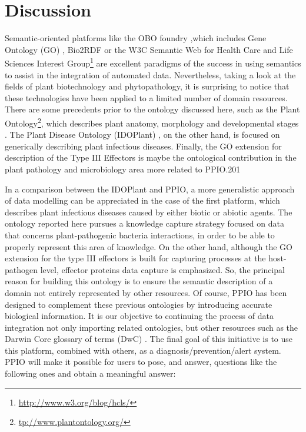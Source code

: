 \documentclass[sw]{iosart2c}
\newcommand{\myurl}[1]{\footnote{\url{#1}}}
\begin{document}
\section{Discussion}\label{sec:discussion}

Semantic-oriented platforms like the OBO foundry \cite{Smith},which includes Gene Ontology (GO) \cite{Gene}, Bio2RDF \cite{RDF} or the W3C Semantic Web for Health Care and Life Sciences Interest Group\myurl{http://www.w3.org/blog/hcls/} are excellent paradigms of the success in using semantics to assist in the integration of automated data. Nevertheless, taking a look at the fields of plant biotechnology and phytopathology, it is surprising to notice that these technologies have been applied to a limited number of domain resources. There are some precedents prior to the ontology discussed here, such as the Plant Ontology\myurl{tp://www.plantontology.org/}, which describes plant anatomy, morphology and developmental stages \cite{PO}. The Plant Disease Ontology (IDOPlant) \cite{Walls} \cite{IDO}, on the other hand, is focused on generically describing plant infectious diseases. Finally, the GO extension for description of the Type III Effectors \cite{Lindeberg} is maybe the ontological contribution in the plant pathology and microbiology area more related to PPIO.201

In a comparison between the IDOPlant and PPIO, a more generalistic approach of data modelling can be appreciated in the case of the first platform, which describes plant infectious diseases caused by either biotic or abiotic agents. The ontology reported here pursues a knowledge capture strategy focused on data that concerns plant-pathogenic bacteria interactions, in order to be able to properly represent this area of knowledge. On the other hand, although the GO extension for the type III effectors is built for capturing processes at the host-pathogen level, effector proteins data capture is emphasized. So, the principal reason for building this ontology is to ensure the semantic description of a domain not entirely represented by other resources. Of course, PPIO has been designed to complement these previous ontologies by introducing accurate biological information. It is our objective to continuing the process of data integration not only importing related ontologies, but other resources such as the Darwin Core glossary of terms (DwC) \cite{Wieczorek2013}. The final goal of this initiative is to use this platform, combined with others, as a diagnosis/prevention/alert system. PPIO will make it possible for users to pose, and answer, questions like the following ones and obtain a meaningful answer:
\end{document}
